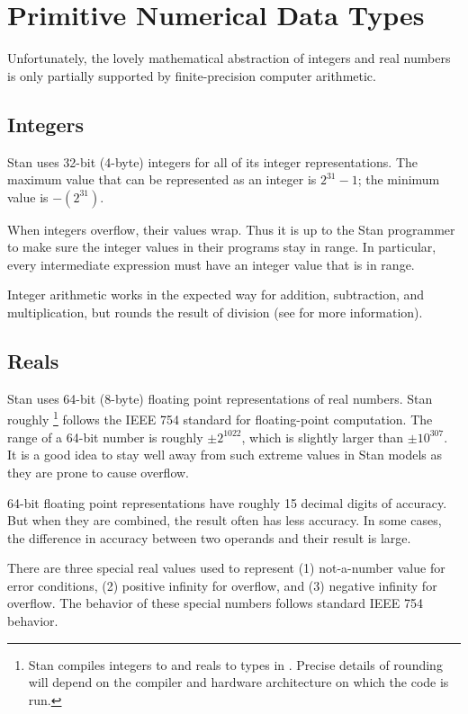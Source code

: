 \section{Primitive Numerical Data Types}\label{numerical-data-types.section}

Unfortunately, the lovely mathematical abstraction of integers and
real numbers is only partially supported by finite-precision computer
arithmetic.

\subsection{Integers}

Stan uses 32-bit (4-byte) integers for all of its integer
representations.  The maximum value that can be represented
as an integer is $2^{31}-1$; the minimum value is $-(2^{31})$.

When integers overflow, their values wrap.  Thus it is up to the Stan
programmer to make sure the integer values in their programs stay in
range.  In particular, every intermediate expression must have an
integer value that is in range.

Integer arithmetic works in the expected way for addition,
subtraction, and multiplication, but rounds the result of division
(see  for more information).

\subsection{Reals}

Stan uses 64-bit (8-byte) floating point representations of real
numbers.  Stan roughly%
%
\footnote{Stan compiles integers to  and reals to
   types in \Cpp.  Precise details of rounding will depend
  on the compiler and hardware architecture on which the code is run.}
%
follows the IEEE 754 standard for floating-point computation.
The range of a 64-bit number is roughly $\pm 2^{1022}$, which is
slightly larger than $\pm 10^{307}$.  It is a good idea to stay well
away from such extreme values in Stan models as they are prone to
cause overflow.

64-bit floating point representations have roughly 15 decimal digits
of accuracy.  But when they are combined, the result often has less
accuracy.  In some cases, the difference in accuracy between two
operands and their result is large.

There are three special real values used to represent (1) not-a-number
value for error conditions, (2) positive infinity for overflow, and
(3) negative infinity for overflow.  The behavior of these special
numbers follows standard IEEE 754 behavior.

